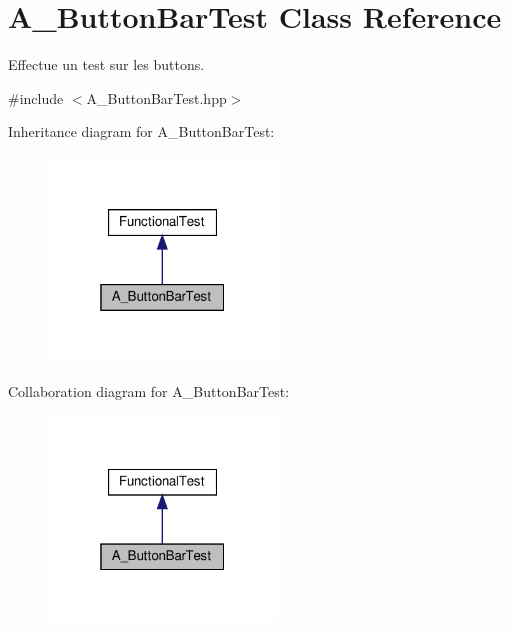 \hypertarget{classA__ButtonBarTest}{}\section{A\+\_\+\+Button\+Bar\+Test Class Reference}
\label{classA__ButtonBarTest}


Effectue un test sur les buttons.  




{\ttfamily \#include $<$A\+\_\+\+Button\+Bar\+Test.\+hpp$>$}



Inheritance diagram for A\+\_\+\+Button\+Bar\+Test\+:
\nopagebreak
\begin{figure}[H]
\begin{center}
\leavevmode
\includegraphics[width=172pt]{classA__ButtonBarTest__inherit__graph}
\end{center}
\end{figure}


Collaboration diagram for A\+\_\+\+Button\+Bar\+Test\+:
\nopagebreak
\begin{figure}[H]
\begin{center}
\leavevmode
\includegraphics[width=172pt]{classA__ButtonBarTest__coll__graph}
\end{center}
\end{figure}
